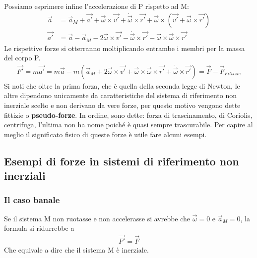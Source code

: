 Possiamo esprimere infine l'accelerazione di P rispetto ad M:
\begin{align*}
	\vec{a} &= \vec{a}_M + \vec{a'} + \vec{\omega} \times \vec{v'} + \dot{\vec{\omega}}\times \vec{r'}+ \vec{\omega}\times (\vec{v'} + \vec{\omega}\times\vec{r'}) \\
	\vec{a'} &= \vec{a} -\vec{a}_M - 2\vec{\omega} \times \vec{v'} - \dot{\vec{\omega}}\times \vec{r'}- \vec{\omega}\times \vec{\omega}\times\vec{r'}
\end{align*}
Le rispettive forze si otterranno moltiplicando entrambe i membri per la massa del corpo P.
\begin{align}\label{eq:pseudoaccelerazioni}
\vec{F'} = m\vec{a'} = m\vec{a} -m(\vec{a}_M + 2\vec{\omega} \times \vec{v'} + \vec{\omega}\times \vec{\omega}\times\vec{r'}+ \dot{\vec{\omega}}\times \vec{r'})= \vec{F} - \vec{F}_{Fittizie}
\end{align}
Si noti che oltre la prima forza, che è quella della seconda legge di Newton, le altre dipendono unicamente da caratteristiche del sistema di riferimento non inerziale scelto e non derivano da vere forze, per questo motivo vengono dette fittizie o \textbf{pseudo-forze}. In ordine, sono dette: forza di trascinamento, di Coriolis, centrifuga, l'ultima non ha nome poiché è quasi sempre trascurabile. Per capire al meglio il significato fisico di queste forze è utile fare alcuni esempi.
\subsection{Esempi di forze in sistemi di riferimento non inerziali}
\subsubsection*{Il caso banale}
Se il sistema M non ruotasse e non accelerasse si avrebbe che $\vec{\omega} = 0$ e $\vec{a}_M=0$, la formula si ridurrebbe a 
\begin{align*}
	\vec{F'} = \vec{F}
\end{align*}
Che equivale a dire che il sistema M è inerziale.
